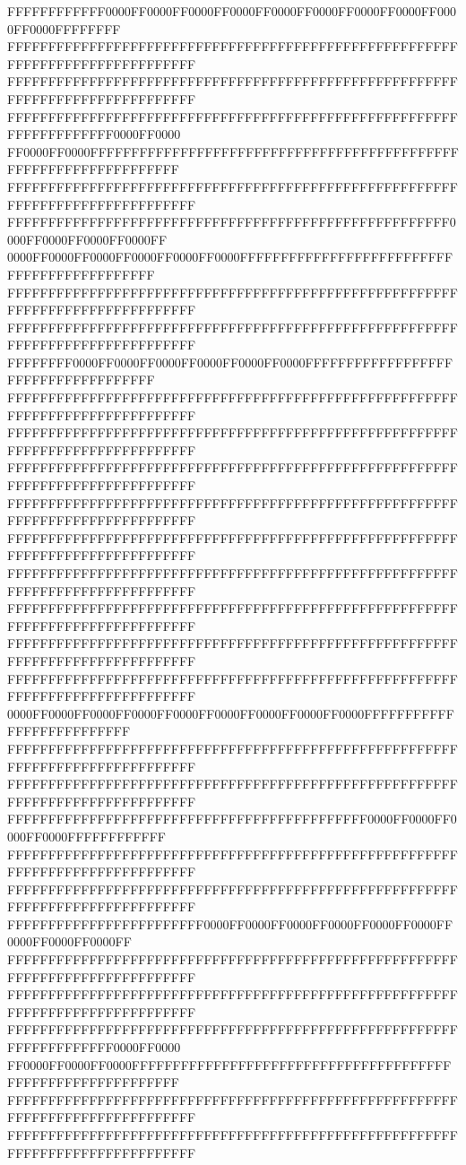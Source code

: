 FFFFFFFFFFFF0000FF0000FF0000FF0000FF0000FF0000FF0000FF0000FF0000FF0000FFFFFFFF
FFFFFFFFFFFFFFFFFFFFFFFFFFFFFFFFFFFFFFFFFFFFFFFFFFFFFFFFFFFFFFFFFFFFFFFFFFFFFF
FFFFFFFFFFFFFFFFFFFFFFFFFFFFFFFFFFFFFFFFFFFFFFFFFFFFFFFFFFFFFFFFFFFFFFFFFFFFFF
FFFFFFFFFFFFFFFFFFFFFFFFFFFFFFFFFFFFFFFFFFFFFFFFFFFFFFFFFFFFFFFFFFFF0000FF0000
FF0000FF0000FFFFFFFFFFFFFFFFFFFFFFFFFFFFFFFFFFFFFFFFFFFFFFFFFFFFFFFFFFFFFFFFFF
FFFFFFFFFFFFFFFFFFFFFFFFFFFFFFFFFFFFFFFFFFFFFFFFFFFFFFFFFFFFFFFFFFFFFFFFFFFFFF
FFFFFFFFFFFFFFFFFFFFFFFFFFFFFFFFFFFFFFFFFFFFFFFFFFFFFF0000FF0000FF0000FF0000FF
0000FF0000FF0000FF0000FF0000FF0000FFFFFFFFFFFFFFFFFFFFFFFFFFFFFFFFFFFFFFFFFFFF
FFFFFFFFFFFFFFFFFFFFFFFFFFFFFFFFFFFFFFFFFFFFFFFFFFFFFFFFFFFFFFFFFFFFFFFFFFFFFF
FFFFFFFFFFFFFFFFFFFFFFFFFFFFFFFFFFFFFFFFFFFFFFFFFFFFFFFFFFFFFFFFFFFFFFFFFFFFFF
FFFFFFFF0000FF0000FF0000FF0000FF0000FF0000FFFFFFFFFFFFFFFFFFFFFFFFFFFFFFFFFFFF
FFFFFFFFFFFFFFFFFFFFFFFFFFFFFFFFFFFFFFFFFFFFFFFFFFFFFFFFFFFFFFFFFFFFFFFFFFFFFF
FFFFFFFFFFFFFFFFFFFFFFFFFFFFFFFFFFFFFFFFFFFFFFFFFFFFFFFFFFFFFFFFFFFFFFFFFFFFFF
FFFFFFFFFFFFFFFFFFFFFFFFFFFFFFFFFFFFFFFFFFFFFFFFFFFFFFFFFFFFFFFFFFFFFFFFFFFFFF
FFFFFFFFFFFFFFFFFFFFFFFFFFFFFFFFFFFFFFFFFFFFFFFFFFFFFFFFFFFFFFFFFFFFFFFFFFFFFF
FFFFFFFFFFFFFFFFFFFFFFFFFFFFFFFFFFFFFFFFFFFFFFFFFFFFFFFFFFFFFFFFFFFFFFFFFFFFFF
FFFFFFFFFFFFFFFFFFFFFFFFFFFFFFFFFFFFFFFFFFFFFFFFFFFFFFFFFFFFFFFFFFFFFFFFFFFFFF
FFFFFFFFFFFFFFFFFFFFFFFFFFFFFFFFFFFFFFFFFFFFFFFFFFFFFFFFFFFFFFFFFFFFFFFFFFFFFF
FFFFFFFFFFFFFFFFFFFFFFFFFFFFFFFFFFFFFFFFFFFFFFFFFFFFFFFFFFFFFFFFFFFFFFFFFFFFFF
FFFFFFFFFFFFFFFFFFFFFFFFFFFFFFFFFFFFFFFFFFFFFFFFFFFFFFFFFFFFFFFFFFFFFFFFFFFFFF
0000FF0000FF0000FF0000FF0000FF0000FF0000FF0000FF0000FFFFFFFFFFFFFFFFFFFFFFFFFF
FFFFFFFFFFFFFFFFFFFFFFFFFFFFFFFFFFFFFFFFFFFFFFFFFFFFFFFFFFFFFFFFFFFFFFFFFFFFFF
FFFFFFFFFFFFFFFFFFFFFFFFFFFFFFFFFFFFFFFFFFFFFFFFFFFFFFFFFFFFFFFFFFFFFFFFFFFFFF
FFFFFFFFFFFFFFFFFFFFFFFFFFFFFFFFFFFFFFFFFFFF0000FF0000FF0000FF0000FFFFFFFFFFFF
FFFFFFFFFFFFFFFFFFFFFFFFFFFFFFFFFFFFFFFFFFFFFFFFFFFFFFFFFFFFFFFFFFFFFFFFFFFFFF
FFFFFFFFFFFFFFFFFFFFFFFFFFFFFFFFFFFFFFFFFFFFFFFFFFFFFFFFFFFFFFFFFFFFFFFFFFFFFF
FFFFFFFFFFFFFFFFFFFFFFFF0000FF0000FF0000FF0000FF0000FF0000FF0000FF0000FF0000FF
FFFFFFFFFFFFFFFFFFFFFFFFFFFFFFFFFFFFFFFFFFFFFFFFFFFFFFFFFFFFFFFFFFFFFFFFFFFFFF
FFFFFFFFFFFFFFFFFFFFFFFFFFFFFFFFFFFFFFFFFFFFFFFFFFFFFFFFFFFFFFFFFFFFFFFFFFFFFF
FFFFFFFFFFFFFFFFFFFFFFFFFFFFFFFFFFFFFFFFFFFFFFFFFFFFFFFFFFFFFFFFFFFF0000FF0000
FF0000FF0000FF0000FFFFFFFFFFFFFFFFFFFFFFFFFFFFFFFFFFFFFFFFFFFFFFFFFFFFFFFFFFFF
FFFFFFFFFFFFFFFFFFFFFFFFFFFFFFFFFFFFFFFFFFFFFFFFFFFFFFFFFFFFFFFFFFFFFFFFFFFFFF
FFFFFFFFFFFFFFFFFFFFFFFFFFFFFFFFFFFFFFFFFFFFFFFFFFFFFFFFFFFFFFFFFFFFFFFFFFFFFF
